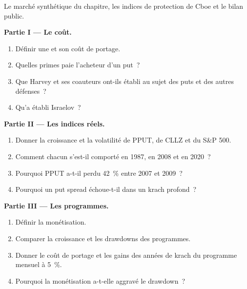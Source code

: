 \begin{problem}\label{pb:s2:tail-hedging-and-long-volatility:1}
Le marché synthétique du chapitre, les indices de protection de Cboe et le bilan public.

\medskip\noindent\textbf{Partie I --- Le coût.}
\begin{enumerate}
\item Définir une  et son coût de portage.
\item Quelles primes paie l'acheteur d'un put~?
\item Que Harvey et ses coauteurs ont-ils établi au sujet des puts et des autres défenses~?
\item Qu'a établi Israelov~?
\end{enumerate}

\medskip\noindent\textbf{Partie II --- Les indices réels.}
\begin{enumerate}[resume]
\item Donner la croissance et la volatilité de PPUT, de CLLZ et du S\&P 500.
\item Comment chacun s'est-il comporté en 1987, en 2008 et en 2020~?
\item Pourquoi PPUT a-t-il perdu 42~\% entre 2007 et 2009~?
\item Pourquoi un put spread échoue-t-il dans un krach profond~?
\end{enumerate}

\medskip\noindent\textbf{Partie III --- Les programmes.}
\begin{enumerate}[resume]
\item Définir la monétisation.
\item Comparer la croissance et les drawdowns des programmes.
\item Donner le coût de portage et les gains des années de krach du programme mensuel à 5~\%.
\item Pourquoi la monétisation a-t-elle aggravé le drawdown~?
\end{enumerate}


\end{problem}
